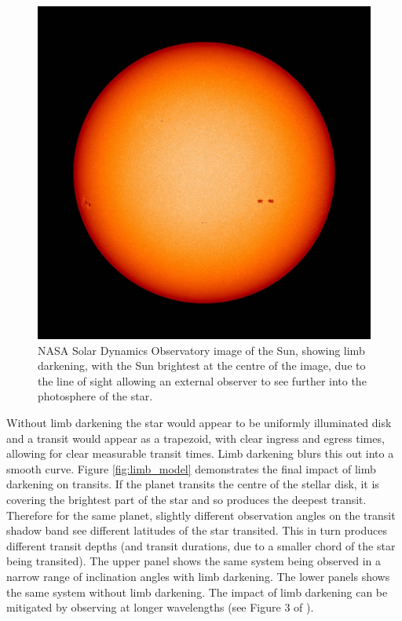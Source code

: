 \begin{figure}[H]
\centering

\includegraphics[width=0.75\columnwidth]{limbdark.jpg}
\caption{NASA Solar Dynamics Observatory image of the Sun, showing limb darkening, with the Sun brightest at the centre of the image, due to the line of sight allowing an external observer to see further into the photosphere of the star.}
\label{fig:limb}
\end{figure}
Without limb darkening the star would appear to be uniformly illuminated disk and a transit would appear as a trapezoid, with clear ingress and egress times, allowing for clear measurable transit times. Limb darkening blurs this out into a smooth curve. Figure \ref{fig:limb_model} demonstrates the final impact of limb darkening on transits. If the planet transits the centre of the stellar disk, it is covering the brightest part of the star and so produces the deepest transit. Therefore for the same planet, slightly different observation angles on the transit shadow band see different latitudes of the star transited. This in turn produces different transit depths (and transit durations, due to a smaller chord of the star being transited). The upper panel shows the same system being observed in a narrow range of inclination angles with limb darkening. The lower panels shows the same system without limb darkening. The impact of limb darkening can be mitigated by observing at longer wavelengths (see Figure 3 of \citealt{2007Knutson}).
